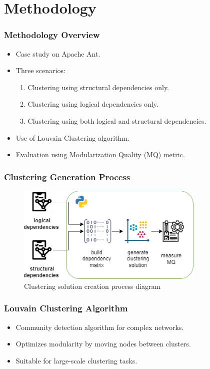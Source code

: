 \documentclass{beamer}
\begin{document}
\section{Methodology}

\begin{frame}
\frametitle{Methodology Overview}
\begin{itemize}
    \item Case study on Apache Ant.
    \item Three scenarios:
    \begin{enumerate}
        \item Clustering using structural dependencies only.
        \item Clustering using logical dependencies only.
        \item Clustering using both logical and structural dependencies.
    \end{enumerate}
    \item Use of Louvain Clustering algorithm.
    \item Evaluation using Modularization Quality (MQ) metric.
\end{itemize}
\end{frame}

\begin{frame}
\frametitle{Clustering Generation Process}
\begin{center}
     \begin{figure}
    \includegraphics[width=0.8\textwidth]{clustering-generation.png}
    \caption{Clustering solution creation process diagram}
    \label{fig:clustering-gen}
     \end{figure}
\end{center}
\end{frame}

\begin{frame}
\frametitle{Louvain Clustering Algorithm}
\begin{itemize}
    \item Community detection algorithm for complex networks.
    \item Optimizes modularity by moving nodes between clusters.
    \item Suitable for large-scale clustering tasks.
\end{itemize}
\end{frame}
\end{document}
